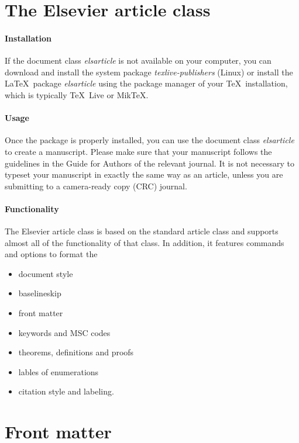 \documentclass[review]{elsarticle}
\begin{document}
\section{The Elsevier article class}

\paragraph{Installation} If the document class \emph{elsarticle} is not available on your computer, you can download and install the system package \emph{texlive-publishers} (Linux) or install the \LaTeX\ package \emph{elsarticle} using the package manager of your \TeX\ installation, which is typically \TeX\ Live or Mik\TeX.

\paragraph{Usage} Once the package is properly installed, you can use the document class \emph{elsarticle} to create a manuscript. Please make sure that your manuscript follows the guidelines in the Guide for Authors of the relevant journal. It is not necessary to typeset your manuscript in exactly the same way as an article, unless you are submitting to a camera-ready copy (CRC) journal.

\paragraph{Functionality} The Elsevier article class is based on the standard article class and supports almost all of the functionality of that class. In addition, it features commands and options to format the
\begin{itemize}
    \item document style
    \item baselineskip
    \item front matter
    \item keywords and MSC codes
    \item theorems, definitions and proofs
    \item lables of enumerations
    \item citation style and labeling.
\end{itemize}

\section{Front matter}
\end{document}
